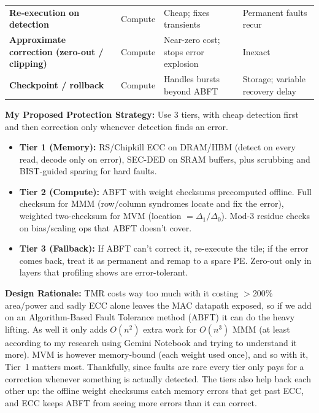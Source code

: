 \documentclass[10pt]{article}
\begin{document}
{\begin{tabularx}{\textwidth}{@{} L{3.9cm} L{1.7cm} Y Y @{}}
		\textbf{Re-execution on detection}                    & Compute        & Cheap; fixes transients                                & Permanent faults recur                                  \\
		\textbf{Approximate correction (zero-out / clipping)} & Compute        & Near-zero cost; stops error explosion                  & Inexact                                                 \\
		\textbf{Checkpoint / rollback}                        & Compute        & Handles bursts beyond ABFT                             & Storage; variable recovery delay                        \\
		\bottomrule
	\end{tabularx}}

\vspace{1.0em}
\pagebreak
{}

\vspace{0.4em}
\noindent\textbf{My Proposed Protection Strategy:} Use 3 tiers, with cheap detection first and then correction only whenever detection finds an error.
\begin{itemize}\small
	\item \textbf{Tier 1 (Memory):} RS/Chipkill ECC on DRAM/HBM (detect on every read, decode only on error), SEC-DED on SRAM buffers, plus scrubbing and BIST-guided sparing for hard faults.
	\item \textbf{Tier 2 (Compute):} ABFT with weight checksums precomputed offline. Full checksum for MMM (row/column syndromes locate and fix the error), weighted two-checksum for MVM (location $= \Delta_1/\Delta_0$). Mod-3 residue checks on bias/scaling ops that ABFT doesn't cover.
	\item \textbf{Tier 3 (Fallback):} If ABFT can't correct it, re-execute the tile; if the error comes back, treat it as permanent and remap to a spare PE. Zero-out only in layers that profiling shows are error-tolerant.
\end{itemize}

\noindent\textbf{Design Rationale:} TMR costs way too much with it costing $>$200\% area/power and sadly ECC
alone leaves the MAC datapath exposed, so if we add on an Algorithm-Based Fault Tolerance method (ABFT) it can
do the heavy lifting. As well it only adds $O(n^2)$ extra work for $O(n^3)$ MMM (at least according to my
research using Gemini Notebook and trying to understand it more). MVM is however memory-bound (each weight used
once), and so with it, Tier~1 matters most. Thankfully, since faults are rare every tier only pays for a
correction whenever something is actually detected. The tiers also help back each other up: the offline weight
checksums catch memory errors that get past ECC, and ECC keeps ABFT from seeing more errors than it can correct.
\end{document}
